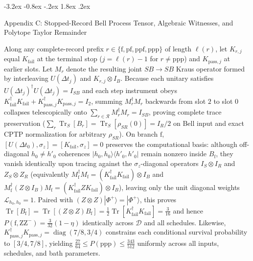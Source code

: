 \documentclass[11pt,letterpaper]{article}
\makeatletter
\renewcommand\section{\@startsection{section}{1}{\z@}%
  {-3.2ex \@plus -0.8ex \@minus -.2ex}%
  {1.8ex \@plus .2ex}%
  {\normalfont\Large\bfseries\raggedright\hyphenpenalty=10000}}
\theoremstyle{definition}
\makeatother
\begin{document}
\section{Appendix C: Stopped-Record Bell Process Tensor, Algebraic
Witnesses, and Polytope Taylor
Remainder}\label{appendix-c-stopped-record-bell-process-tensor-algebraic-witnesses-and-polytope-taylor-remainder}

Along any complete-record prefix
\(r \in \{\mathrm{f}, \mathrm{pf}, \mathrm{ppf}, \mathrm{ppp}\}\) of
length \(\ell(r)\), let \(K_{r,j}\) equal \(K_{\mathrm{fail}}\) at the
terminal stop (\(j = \ell(r) - 1\) for \(r \neq \mathrm{ppp}\)) and
\(K_{\mathrm{pass}, j}\) at earlier slots. Let \(M_r\) denote the
resulting joint \(SB \to SB\) Kraus operator formed by interleaving
\(U(\Delta t_j)\) and \(K_{r,j} \otimes I_B\). Because each unitary
satisfies \(U(\Delta t_j)^\dagger U(\Delta t_j) = I_{SB}\) and each step
instrument obeys
\(K_{\mathrm{fail}}^\dagger K_{\mathrm{fail}} + K_{\mathrm{pass}, j}^\dagger K_{\mathrm{pass}, j} = I_2\),
summing \(M_r^\dagger M_r\) backwards from slot \(2\) to slot \(0\)
collapses telescopically onto
\(\sum_{r \in \mathcal{R}} M_r^\dagger M_r = I_{SB}\), proving complete
trace preservation
(\(\sum_r \operatorname{Tr}_S[B_r] = \operatorname{Tr}_S[\rho_{SR}(0)] = I_R/2\)
on Bell input and exact CPTP normalization for arbitrary \(\rho_{SR}\)).
On branch \(\mathrm{f}\),
\([U(\Delta t_0), \sigma_z] = [K_{\mathrm{fail}}, \sigma_z] = 0\)
preserves the computational basis: although off-diagonal
\(h_0 \neq h'_0\) coherences \(|h_0, h_0\rangle\langle h'_0, h'_0|\)
remain nonzero inside \(B_{\mathrm{f}}\), they vanish identically upon
tracing against the \(\sigma_z\)-diagonal operators \(I_S \otimes I_R\)
and \(Z_S \otimes Z_R\) (equivalently
\(M_{\mathrm{f}}^\dagger M_{\mathrm{f}} = (K_{\mathrm{fail}}^\dagger K_{\mathrm{fail}})\otimes I_B\)
and
\(M_{\mathrm{f}}^\dagger (Z \otimes I_B) M_{\mathrm{f}} = (K_{\mathrm{fail}}^\dagger Z K_{\mathrm{fail}})\otimes I_B\)),
leaving only the unit diagonal weights \(\mathcal{L}_{h_0, h_0} = 1\).
Paired with \((Z\otimes Z)|\Phi^+\rangle = |\Phi^+\rangle\), this proves
\(\operatorname{Tr}[B_{\mathrm{f}}] = \operatorname{Tr}[(Z\otimes Z) B_{\mathrm{f}}] = \frac{1}{2}\operatorname{Tr}[K_{\mathrm{fail}}^\dagger K_{\mathrm{fail}}] = \frac{3}{16}\)
and hence \(P(\mathrm{f}, \mathrm{ZZ}^-) = \frac{3}{32}(1 - \eta)\)
identically across \(\mathcal{D}\) and all schedules. Likewise,
\(K_{\mathrm{pass}, j}^\dagger K_{\mathrm{pass}, j} = \operatorname{diag}(7/8, 3/4)\)
constrains each conditional survival probability to \([3/4, 7/8]\),
yielding \(\frac{27}{64} \le P(\mathrm{ppp}) \le \frac{343}{512}\)
uniformly across all inputs, schedules, and bath parameters.
\end{document}
